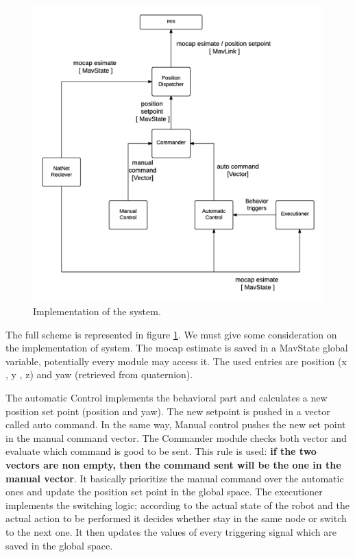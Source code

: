 \begin{figure}[h]
\centering
 \includegraphics[width=1\textwidth]{arch_scheme.png}
 \caption[Achtitecture scheme]{Implementation of the system.}
 \label{figure:archscheme}
\end{figure}
The full scheme is represented in figure \ref{figure:archscheme}. We must give some consideration on the implementation of system. The mocap estimate is saved in a MavState global variable, potentially every module may access it. The used entries are position (x , y , z) and yaw (retrieved from quaternion).

The automatic Control implements the behavioral part and calculates a new position set point (position and yaw). The new setpoint is pushed in a vector called auto command. In the same way, Manual control pushes the new set point in the manual command vector. The Commander module checks both vector and evaluate which command is good to be sent. This rule is used: \textbf{if the two vectors are non empty, then the command sent will be the one in the manual vector}. It basically prioritize the manual command over the automatic ones and update the position set point in the global space. The executioner implements the switching logic; according to the actual state of the robot and the actual action to be performed it decides whether stay in the same node or switch to the next one. It then updates the values of every triggering signal which are saved in the global space.

